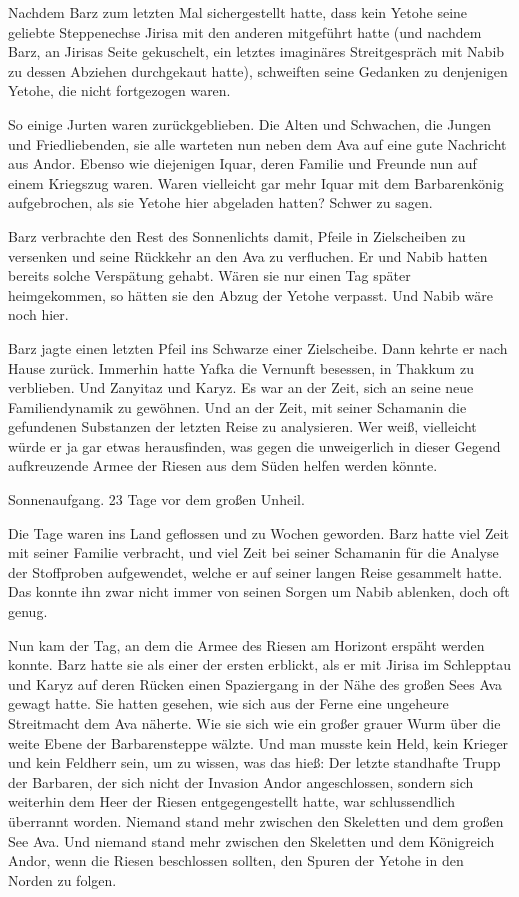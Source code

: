 Nachdem Barz zum letzten Mal sichergestellt hatte, dass kein Yetohe seine geliebte Steppenechse Jirisa mit den anderen mitgeführt hatte (und nachdem Barz, an Jirisas Seite gekuschelt, ein letztes imaginäres Streitgespräch mit Nabib zu dessen Abziehen durchgekaut hatte), schweiften seine Gedanken zu denjenigen Yetohe, die nicht fortgezogen waren.

So einige Jurten waren zurückgeblieben. Die Alten und Schwachen, die Jungen und Friedliebenden, sie alle warteten nun neben dem Ava auf eine gute Nachricht aus Andor. Ebenso wie diejenigen Iquar, deren Familie und Freunde nun auf einem Kriegszug waren. Waren vielleicht gar mehr Iquar mit dem Barbarenkönig aufgebrochen, als sie Yetohe hier abgeladen hatten? Schwer zu sagen.

Barz verbrachte den Rest des Sonnenlichts damit, Pfeile in Zielscheiben zu versenken und seine Rückkehr an den Ava zu verfluchen. Er und Nabib hatten bereits solche Verspätung gehabt. Wären sie nur einen Tag später heimgekommen, so hätten sie den Abzug der Yetohe verpasst. Und Nabib wäre noch hier.

Barz jagte einen letzten Pfeil ins Schwarze einer Zielscheibe. Dann kehrte er nach Hause zurück. Immerhin hatte Yafka die Vernunft besessen, in Thakkum zu verblieben. Und Zanyitaz und Karyz. Es war an der Zeit, sich an seine neue Familiendynamik zu gewöhnen. Und an der Zeit, mit seiner Schamanin die gefundenen Substanzen der letzten Reise zu analysieren. Wer weiß, vielleicht würde er ja gar etwas herausfinden, was gegen die unweigerlich in dieser Gegend aufkreuzende Armee der Riesen aus dem Süden helfen werden könnte.\bigskip







Sonnenaufgang. 23 Tage vor dem großen Unheil.\bigskip



Die Tage waren ins Land geflossen und zu Wochen geworden. Barz hatte viel Zeit mit seiner Familie verbracht, und viel Zeit bei seiner Schamanin für die Analyse der Stoffproben aufgewendet, welche er auf seiner langen Reise gesammelt hatte. Das konnte ihn zwar nicht immer von seinen Sorgen um Nabib ablenken, doch oft genug.

Nun kam der Tag, an dem die Armee des Riesen am Horizont erspäht werden konnte. Barz hatte sie als einer der ersten erblickt, als er mit Jirisa im Schlepptau und Karyz auf deren Rücken einen Spaziergang in der Nähe des großen Sees Ava gewagt hatte. Sie hatten gesehen, wie sich aus der Ferne eine ungeheure Streitmacht dem Ava näherte. Wie sie sich wie ein großer grauer Wurm über die weite Ebene der Barbarensteppe wälzte. Und man musste kein Held, kein Krieger und kein Feldherr sein, um zu wissen, was das hieß: Der letzte standhafte Trupp der Barbaren, der sich nicht der Invasion Andor angeschlossen, sondern sich weiterhin dem Heer der Riesen entgegengestellt hatte, war schlussendlich überrannt worden. Niemand stand mehr zwischen den Skeletten und dem großen See Ava. Und niemand stand mehr zwischen den Skeletten und dem Königreich Andor, wenn die Riesen beschlossen sollten, den Spuren der Yetohe in den Norden zu folgen.

